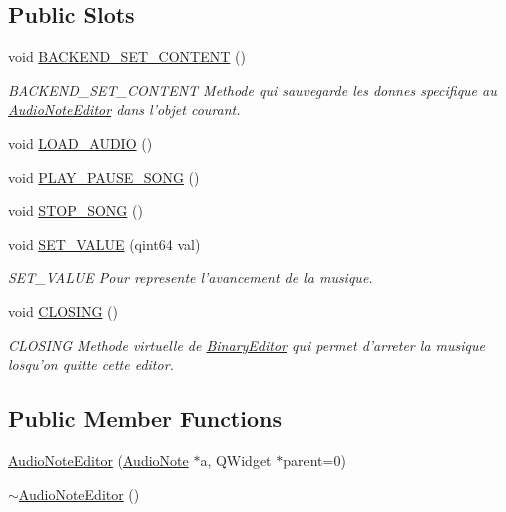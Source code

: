 \subsection*{Public Slots}
\begin{DoxyCompactItemize}
\item 
void \hyperlink{class_audio_note_editor_a04ec60a70f748ad3ac5b1664d66356b1}{B\-A\-C\-K\-E\-N\-D\-\_\-\-S\-E\-T\-\_\-\-C\-O\-N\-T\-E\-N\-T} ()
\begin{DoxyCompactList}\small\item\em B\-A\-C\-K\-E\-N\-D\-\_\-\-S\-E\-T\-\_\-\-C\-O\-N\-T\-E\-N\-T Methode qui sauvegarde les donnes specifique au \hyperlink{class_audio_note_editor}{Audio\-Note\-Editor} dans l'objet courant. \end{DoxyCompactList}\item 
void \hyperlink{class_audio_note_editor_a502cd2cb03717e6c39a547c05bb7469e}{L\-O\-A\-D\-\_\-\-A\-U\-D\-I\-O} ()
\item 
void \hyperlink{class_audio_note_editor_a9074411239cfbddfc9d826621330cde2}{P\-L\-A\-Y\-\_\-\-P\-A\-U\-S\-E\-\_\-\-S\-O\-N\-G} ()
\item 
void \hyperlink{class_audio_note_editor_ab2ba8eebe8cf3255a05ca0a4339dbe1a}{S\-T\-O\-P\-\_\-\-S\-O\-N\-G} ()
\item 
void \hyperlink{class_audio_note_editor_a4e694e0cb99746cf42de7c9d25e2caa5}{S\-E\-T\-\_\-\-V\-A\-L\-U\-E} (qint64 val)
\begin{DoxyCompactList}\small\item\em S\-E\-T\-\_\-\-V\-A\-L\-U\-E Pour represente l'avancement de la musique. \end{DoxyCompactList}\item 
void \hyperlink{class_audio_note_editor_addd084af0fa9d4a317ba9f330acdba1b}{C\-L\-O\-S\-I\-N\-G} ()
\begin{DoxyCompactList}\small\item\em C\-L\-O\-S\-I\-N\-G Methode virtuelle de \hyperlink{class_binary_editor}{Binary\-Editor} qui permet d'arreter la musique losqu'on quitte cette editor. \end{DoxyCompactList}\end{DoxyCompactItemize}
\subsection*{Public Member Functions}
\begin{DoxyCompactItemize}
\item 
\hyperlink{class_audio_note_editor_ac620fe3bee72265ddd3f7e4313ac9c49}{Audio\-Note\-Editor} (\hyperlink{class_audio_note}{Audio\-Note} $\ast$a, Q\-Widget $\ast$parent=0)
\item 
\hyperlink{class_audio_note_editor_ac8560e719e6d36beb8750808c75daba7}{$\sim$\-Audio\-Note\-Editor} ()
\end{DoxyCompactItemize}
